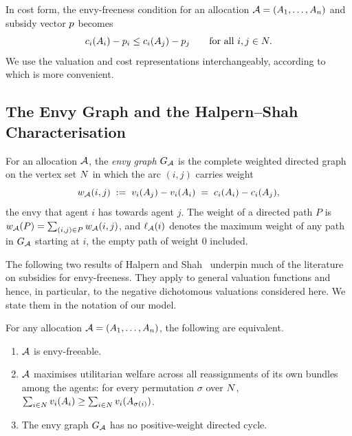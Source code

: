 In cost form, the envy-freeness condition for an allocation $\mathcal{A}=(A_{1},\ldots,A_{n})$ and subsidy vector $p$ becomes
\[
    c_i(A_{i})-p_i
    \le
    c_i(A_{j})-p_j
    \qquad\text{for all }i,j\in N.
\]
We use the valuation and cost representations interchangeably, according to which is more convenient.
\subsection{The Envy Graph and the Halpern--Shah Characterisation}
\label{sec:envygraph}



For an allocation $\mathcal{A}$, the \emph{envy graph} $G_{\mathcal{A}}$ is the
complete weighted directed graph on the vertex set $N$ in which the arc
$(i,j)$ carries weight
\[
  w_{\mathcal{A}}(i,j) \;:=\; v_i(A_{j}) - v_i(A_{i})
  \;=\; c_i(A_{i}) - c_i(A_{j}),
\]
the envy that agent $i$ has towards agent $j$. The weight of a directed path
$P$ is $w_{\mathcal{A}}(P) = \sum_{(i,j) \in P} w_{\mathcal{A}}(i,j)$, and
$\ell_{\mathcal{A}}(i)$ denotes the maximum weight of any path in
$G_{\mathcal{A}}$ starting at $i$, the empty path of weight $0$ included.

The following two results of Halpern and Shah~\cite{HS19} underpin much of the literature on subsidies for envy-freeness. They apply to general valuation functions and hence, in particular, to the negative dichotomous valuations considered here. We state them in the notation of our model.
\begin{theorem}[\cite{HS19}]
\label{thm:hs-characterisation}
For any allocation $\mathcal{A} = (A_{1},\dots,A_{n})$, the following are
equivalent.
\begin{enumerate}
  \item[(i)] $\mathcal{A}$ is envy-freeable.
  \item[(ii)] $\mathcal{A}$ maximises utilitarian welfare across all reassignments of
    its own bundles among the agents: for every permutation $\sigma$ over
    $N$, $\sum_{i \in N} v_i(A_{i}) \ge
    \sum_{i \in N} v_i(A_{\sigma(i)})$.
  \item[(iii)] The envy graph $G_{\mathcal{A}}$ has no positive-weight
    directed cycle.
\end{enumerate}
\end{theorem}

